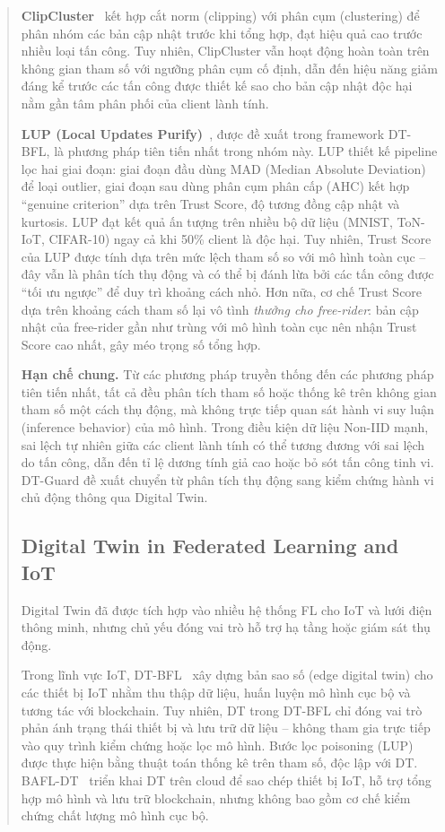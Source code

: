 \documentclass[runningheads]{llncs}
\begin{document}
\begin{abstract}
\textbf{ClipCluster}~\cite{zeng2024clipcluster} kết hợp cắt norm (clipping) với phân cụm (clustering) để phân nhóm các bản cập nhật trước khi tổng hợp, đạt hiệu quả cao trước nhiều loại tấn công. Tuy nhiên, ClipCluster vẫn hoạt động hoàn toàn trên không gian tham số với ngưỡng phân cụm cố định, dẫn đến hiệu năng giảm đáng kể trước các tấn công được thiết kế sao cho bản cập nhật độc hại nằm gần tâm phân phối của client lành tính.

\textbf{LUP (Local Updates Purify)}~\cite{issa2025dtbfl}, được đề xuất trong framework DT-BFL, là phương pháp tiên tiến nhất trong nhóm này. LUP thiết kế pipeline lọc hai giai đoạn: giai đoạn đầu dùng MAD (Median Absolute Deviation) để loại outlier, giai đoạn sau dùng phân cụm phân cấp (AHC) kết hợp ``genuine criterion'' dựa trên Trust Score, độ tương đồng cập nhật và kurtosis. LUP đạt kết quả ấn tượng trên nhiều bộ dữ liệu (MNIST, ToN-IoT, CIFAR-10) ngay cả khi 50\% client là độc hại. Tuy nhiên, Trust Score của LUP được tính dựa trên mức lệch tham số so với mô hình toàn cục -- đây vẫn là phân tích thụ động và có thể bị đánh lừa bởi các tấn công được ``tối ưu ngược'' để duy trì khoảng cách nhỏ. Hơn nữa, cơ chế Trust Score dựa trên khoảng cách tham số lại vô tình \emph{thưởng cho free-rider}: bản cập nhật của free-rider gần như trùng với mô hình toàn cục nên nhận Trust Score cao nhất, gây méo trọng số tổng hợp.

\textbf{Hạn chế chung.} Từ các phương pháp truyền thống đến các phương pháp tiên tiến nhất, tất cả đều phân tích tham số hoặc thống kê trên không gian tham số một cách thụ động, mà không trực tiếp quan sát hành vi suy luận (inference behavior) của mô hình. Trong điều kiện dữ liệu Non-IID mạnh, sai lệch tự nhiên giữa các client lành tính có thể tương đương với sai lệch do tấn công, dẫn đến tỉ lệ dương tính giả cao hoặc bỏ sót tấn công tinh vi. DT-Guard đề xuất chuyển từ phân tích thụ động sang kiểm chứng hành vi chủ động thông qua Digital Twin.

\subsection{Digital Twin in Federated Learning and IoT}

Digital Twin đã được tích hợp vào nhiều hệ thống FL cho IoT và lưới điện thông minh, nhưng chủ yếu đóng vai trò hỗ trợ hạ tầng hoặc giám sát thụ động.

Trong lĩnh vực IoT, DT-BFL~\cite{issa2025dtbfl} xây dựng bản sao số (edge digital twin) cho các thiết bị IoT nhằm thu thập dữ liệu, huấn luyện mô hình cục bộ và tương tác với blockchain. Tuy nhiên, DT trong DT-BFL chỉ đóng vai trò phản ánh trạng thái thiết bị và lưu trữ dữ liệu -- không tham gia trực tiếp vào quy trình kiểm chứng hoặc lọc mô hình. Bước lọc poisoning (LUP) được thực hiện bằng thuật toán thống kê trên tham số, độc lập với DT. BAFL-DT~\cite{qu2021bafldt} triển khai DT trên cloud để sao chép thiết bị IoT, hỗ trợ tổng hợp mô hình và lưu trữ blockchain, nhưng không bao gồm cơ chế kiểm chứng chất lượng mô hình cục bộ.


\end{abstract}
\end{document}
